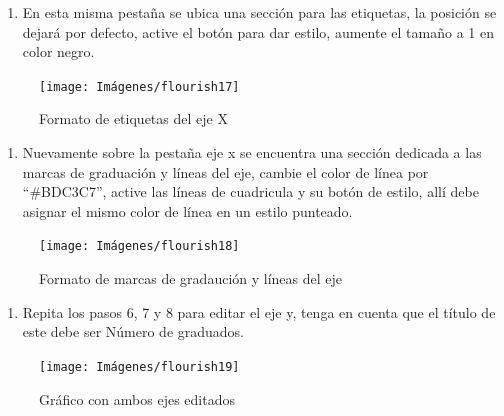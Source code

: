 \documentclass[
]{book}
\providecommand{\tightlist}{%
  \setlength{\itemsep}{0pt}\setlength{\parskip}{0pt}}
\begin{document}
\begin{enumerate}
\def\labelenumi{\arabic{enumi}.}
\setcounter{enumi}{6}
\tightlist
\item
  En esta misma pestaña se ubica una sección para las etiquetas, la posición se dejará por defecto, active el botón para dar estilo, aumente el tamaño a 1 en color negro.
\end{enumerate}

\begin{figure}

{\centering \texttt{[image: Imágenes/flourish17]} 

}

\caption{Formato de etiquetas del eje X}\label{fig:editarejexetiquetasflourish-fig}
\end{figure}

\begin{enumerate}
\def\labelenumi{\arabic{enumi}.}
\setcounter{enumi}{7}
\tightlist
\item
  Nuevamente sobre la pestaña eje x se encuentra una sección dedicada a las marcas de graduación y líneas del eje, cambie el color de línea por ``\#BDC3C7'', active las líneas de cuadricula y su botón de estilo, allí debe asignar el mismo color de línea en un estilo punteado.
\end{enumerate}

\begin{figure}

{\centering \texttt{[image: Imágenes/flourish18]} 

}

\caption{Formato de marcas de gradaución y líneas del eje}\label{fig:marcasdegraduacionylineasdelejeflourish-fig}
\end{figure}

\begin{enumerate}
\def\labelenumi{\arabic{enumi}.}
\setcounter{enumi}{8}
\tightlist
\item
  Repita los pasos 6, 7 y 8 para editar el eje y, tenga en cuenta que el título de este debe ser Número de graduados.
\end{enumerate}

\begin{figure}

{\centering \texttt{[image: Imágenes/flourish19]} 

}

\caption{Gráfico con ambos ejes editados}\label{fig:formatodeambosejesflourish-fig}
\end{figure}
\end{document}

